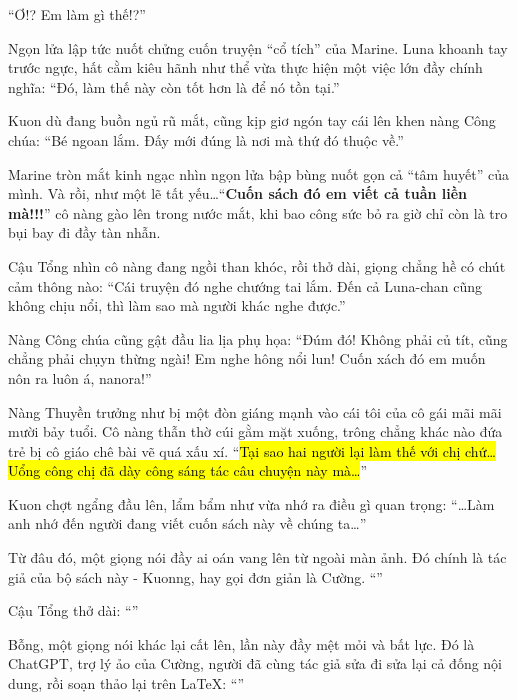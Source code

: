 \documentclass[../main.tex]{subfiles}
\begin{document}
``Ơ!? Em làm gì thế!?''

Ngọn lửa lập tức nuốt chửng cuốn truyện ``cổ tích'' của Marine. Luna khoanh tay trước ngực, hất cằm kiêu hãnh như thể vừa thực hiện một việc lớn đầy chính nghĩa: ``Đó, làm thế này còn tốt hơn là để nó tồn tại.''

Kuon dù đang buồn ngủ rũ mắt, cũng kịp giơ ngón tay cái lên khen nàng Công chúa: ``Bé ngoan lắm. Đấy mới đúng là nơi mà thứ đó thuộc về.''


Marine tròn mắt kinh ngạc nhìn ngọn lửa bập bùng nuốt gọn cả ``tâm huyết'' của mình. Và rồi, như một lẽ tất yếu\dots ``\textbf{Cuốn sách đó em viết cả tuần liền mà!!!}'' cô nàng gào lên trong nước mắt, khi bao công sức bỏ ra giờ chỉ còn là tro bụi bay đi đầy tàn nhẫn.

Cậu Tổng nhìn cô nàng đang ngồi than khóc, rồi thở dài, giọng chẳng hề có chút cảm thông nào: ``Cái truyện đó nghe chướng tai lắm. Đến cả Luna-chan cũng không chịu nổi, thì làm sao mà người khác nghe được.''

Nàng Công chúa cũng gật đầu lia lịa phụ họa: ``Đúm đó! Không phải củ tít, cũng chẳng phải chụyn thừng ngài! Em nghe hông nổi lun! Cuốn xách đó em muốn nôn ra luôn á, nanora!''

Nàng Thuyền trưởng như bị một đòn giáng mạnh vào cái tôi của cô gái mãi mãi mười bảy tuổi. Cô nàng thẫn thờ cúi gằm mặt xuống, trông chẳng khác nào đứa trẻ bị cô giáo chê bài vẽ quá xấu xí. ``\hl{Tại sao hai người lại làm thế với chị chứ\dots{} Uổng công chị đã dày công sáng tác câu chuyện này mà\dots}''

\il

Kuon chợt ngẩng đầu lên, lẩm bẩm như vừa nhớ ra điều gì quan trọng: ``\dots Làm anh nhớ đến người đang viết cuốn sách này về chúng ta\dots''

Từ đâu đó, một giọng nói đầy ai oán vang lên từ ngoài màn ảnh. Đó chính là tác giả của bộ sách này - Kuonng, hay gọi đơn giản là Cường. ``''

Cậu Tổng thở dài: ``''

Bỗng, một giọng nói khác lại cất lên, lần này đầy mệt mỏi và bất lực. Đó là ChatGPT, trợ lý ảo của Cường, người đã cùng tác giả sửa đi sửa lại cả đống nội dung, rồi soạn thảo lại trên LaTeX: ``''
\end{document}
